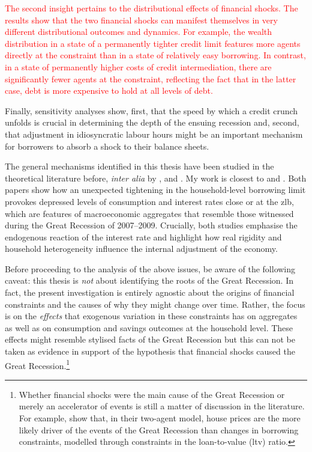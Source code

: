 \documentclass[12pt]{article} %
\numberwithin{equation}{section} %
\numberwithin{figure}{section}
\numberwithin{table}{section}
\begin{document}
\textcolor{red}{The second insight pertains to the distributional effects of financial shocks. The results show that the two financial shocks can manifest themselves in very different distributional outcomes and dynamics. For example, the wealth distribution in a state of a permanently tighter credit limit features more agents directly at the constraint than in a state of relatively easy borrowing. In contrast, in a state of permanently higher costs of credit intermediation, there are significantly fewer agents at the constraint, reflecting the fact that in the latter case, debt is more expensive to hold at all levels of debt.}

Finally, sensitivity analyses show, first, that the speed by which a credit crunch unfolds is crucial in determining the depth of the ensuing recession and, second, that adjustment in idiosyncratic labour hours might be an important mechanism for borrowers to absorb a shock to their balance sheets.

The general mechanisms identified in this thesis have been studied in the theoretical literature before, \textit{inter alia} by \textcite{egg2012}, \textcite{riosrull2015} and \textcite{gl2017}. My work is closest to \textcite{egg2012} and \textcite{gl2017}. Both papers show how an unexpected tightening in the household-level borrowing limit provokes depressed levels of consumption and interest rates close or at the \Gls{zlb}, which are features of macroeconomic aggregates that resemble those witnessed during the Great Recession of 2007--2009. Crucially, both studies emphasise the endogenous reaction of the interest rate and highlight how real rigidity and household heterogeneity influence the internal adjustment of the economy.

Before proceeding to the analysis of the above issues, be aware of the following caveat: this thesis is \textit{not} about identifying the roots of the Great Recession. In fact, the present investigation is entirely agnostic about the origins of financial constraints and the causes of why they might change over time. Rather, the focus is on the \textit{effects} that exogenous variation in these constraints has on aggregates as well as on consumption and savings outcomes at the household level. These effects might resemble stylised facts of the Great Recession but this can not be taken as evidence in support of the hypothesis that financial shocks caused the Great Recession.\footnote{Whether financial shocks were the main cause of the Great Recession or merely an accelerator of events is still a matter of discussion in the literature. For example, \textcite{justiniano2015} show that, in their two-agent model, house prices are the more likely driver of the events of the Great Recession than changes in borrowing constraints, modelled through constraints in the loan-to-value (\Gls{ltv}) ratio.}
\end{document}

